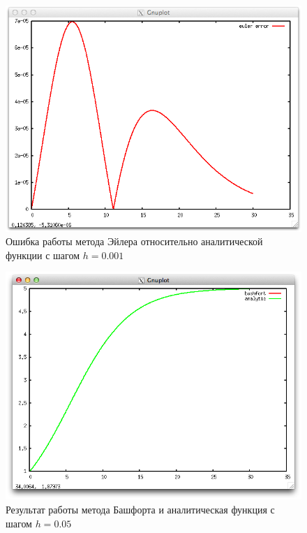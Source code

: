 \documentclass{article}
\begin{document}
  \begin{figure}
    \includegraphics[width=13cm]{eulerError0001.png}
    \caption{Ошибка работы метода Эйлера относительно аналитической функции с
    шагом $h=0.001$}
  \end{figure}

  \begin{figure}
    \includegraphics[width=13cm]{bashfortVSanalytic005.png}
    \caption{Результат работы метода Башфорта и аналитическая функция с шагом
    $h=0.05$}
    \label{eulerVSanalytic}
  \end{figure}
  
\end{document}

